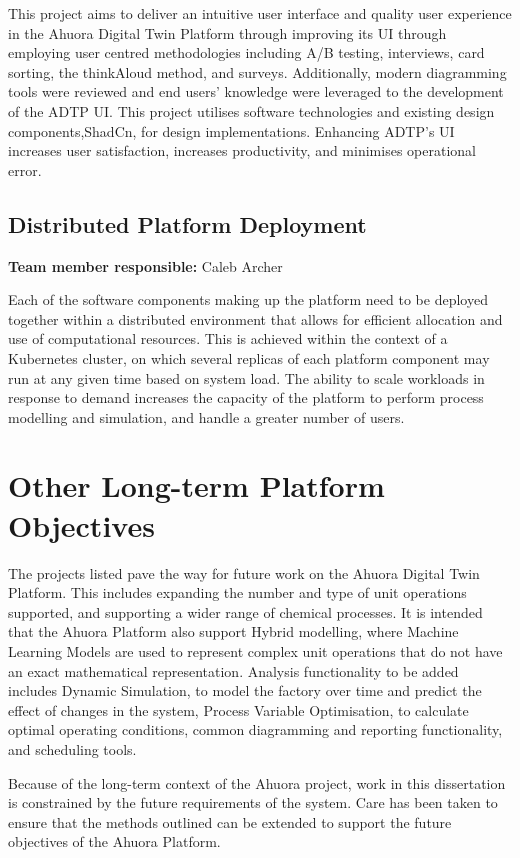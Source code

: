 This project aims to deliver an intuitive user interface and quality user experience in the Ahuora Digital Twin Platform through improving its UI through employing user centred methodologies including A/B testing, interviews, card sorting, the thinkAloud method, and surveys. Additionally, modern diagramming tools were reviewed and end users' knowledge were leveraged to the development of the ADTP UI. This project utilises software technologies and existing design components,ShadCn, for design implementations. Enhancing ADTP's UI increases user satisfaction, increases productivity, and minimises operational error.  

\subsection{Distributed Platform Deployment}

\textbf{Team member responsible:} Caleb Archer

Each of the software components making up the platform need to be deployed together within a distributed environment that allows for efficient allocation and use of computational resources. This is achieved within the context of a Kubernetes cluster, on which several replicas of each platform component may run at any given time based on system load. The ability to scale workloads in response to demand increases the capacity of the platform to perform process modelling and simulation, and handle a greater number of users.

\section{Other Long-term Platform Objectives}

The projects listed pave the way for future work on the Ahuora Digital Twin Platform. This includes expanding the number and type of unit operations supported, and supporting a wider range of chemical processes. It is intended that the Ahuora Platform also support Hybrid modelling, where Machine Learning Models are used to represent complex unit operations that do not have an exact mathematical representation. Analysis functionality to be added includes Dynamic Simulation, to model the factory over time and predict the effect of changes in the system, Process Variable Optimisation, to calculate optimal operating conditions, common diagramming and reporting functionality, and scheduling tools.

Because of the long-term context of the Ahuora project, work in this dissertation is constrained by the future requirements of the system. Care has been taken to ensure that the methods outlined can be extended to support the future objectives of the Ahuora Platform.
